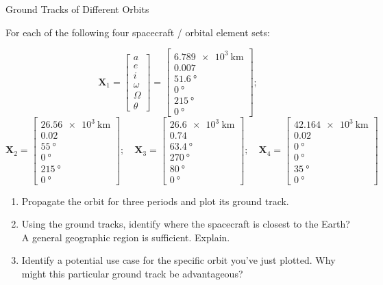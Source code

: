 \begin{hwkProblem}{3}{Ground Tracks of Different Orbits} \label{hwk:p03}

	For each of the following four spacecraft / orbital element sets:

	\[
		\boldsymbol{X}_1=\left[\begin{array}{c}
			a \\
			e \\
			i \\
			\omega \\
			\Omega \\
			\theta
		\end{array}\right] = \left[\begin{array}{cc}
			\qty{6.789e3}{\km} \\
			0.007 \\
			\qty{51.6}{\degree} \\
			\qty{0}{\degree} \\
			\qty{215}{\degree} \\
			\qty{0}{\degree}
		\end{array}\right];
	\]
	\[
		\boldsymbol{X}_2 = \left[\begin{array}{c}
			\qty{26.56e3}{\km} \\
			0.02 \\
			\qty{55}{\degree} \\
			\qty{0}{\degree} \\
			\qty{215}{\degree} \\
			\qty{0}{\degree}
		\end{array}\right]; \quad
		\boldsymbol{X}_3=\left[\begin{array}{c}
			\qty{26.6e3}{\km} \\
			0.74 \\
			\qty{63.4}{\degree} \\
			\qty{270}{\degree} \\
			\qty{80}{\degree} \\
			\qty{0}{\degree}
		\end{array}\right]; \quad
		\boldsymbol{X}_4=\left[\begin{array}{c}
			\qty{42.164e3}{\km} \\
			0.02 \\
			\qty{0}{\degree} \\
			\qty{0}{\degree} \\
			\qty{35}{\degree} \\
			\qty{0}{\degree}
		\end{array}\right]
	\]
	\begin{enumerate}
		\item \label{hwk:p03a} Propagate the orbit for three periods and plot its ground track.
		\item \label{hwk:p03b} Using the ground tracks, identify where the spacecraft is closest to the Earth? A general geographic region is sufficient. Explain.
		\item \label{hwk:p03c} Identify a potential use case for the specific orbit you’ve just plotted. Why might this particular ground track be advantageous?
	\end{enumerate}


\end{hwkProblem}
